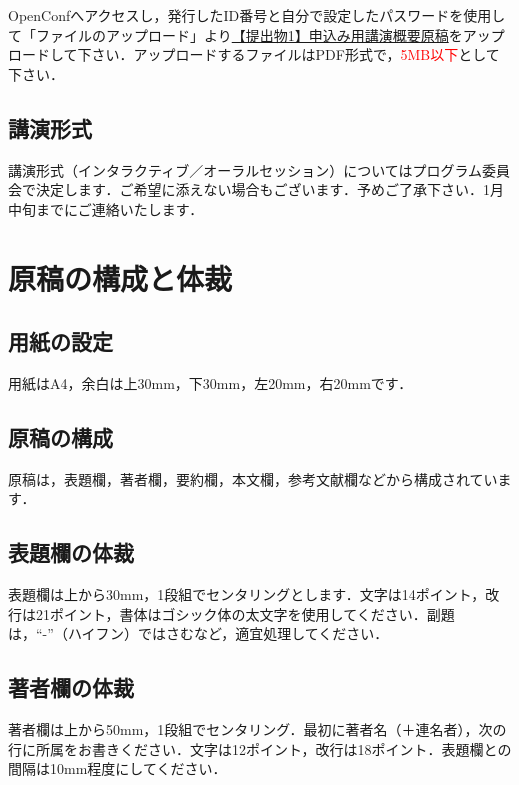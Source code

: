 \documentclass[a4j,twocolumn,10pt]{jarticle}
\begin{document}
OpenConfへアクセスし，発行したID番号と自分で設定したパスワードを使用して「ファイルのアップロード」より\underline{【提出物1】申込み用講演概要原稿}をアップロードして下さい．アップロードするファイルはPDF形式で，\textcolor{red}{5MB以下}として下さい．

\fbox{\textcolor{red}{提出期限は, 2021年12月3日（金）です！}}

\subsection{講演形式}

講演形式（インタラクティブ／オーラルセッション）についてはプログラム委員会で決定します．ご希望に添えない場合もございます．予めご了承下さい．1月中旬までにご連絡いたします．


\section{原稿の構成と体裁}

\subsection{用紙の設定}

用紙はA4，余白は上30mm，下30mm，左20mm，右20mmです．

\subsection{原稿の構成}

原稿は，表題欄，著者欄，要約欄，本文欄，参考文献欄などから構成されています．

\subsection{表題欄の体裁}

表題欄は上から30mm，1段組でセンタリングとします．文字は14ポイント，改行は21ポイント，書体はゴシック体の太文字を使用してください．副題は，“-”（ハイフン）ではさむなど，適宜処理してください．

\subsection{著者欄の体裁}

著者欄は上から50mm，1段組でセンタリング．最初に著者名（＋連名者），次の行に所属をお書きください．文字は12ポイント，改行は18ポイント．表題欄との間隔は10mm程度にしてください．
\end{document}
